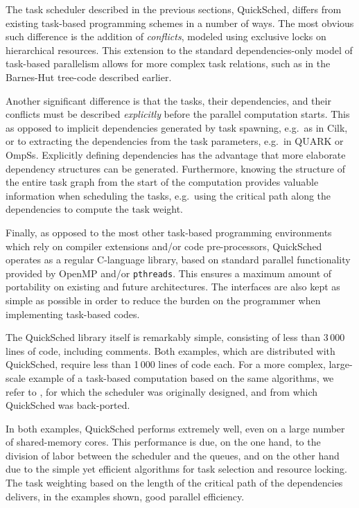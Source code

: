\documentclass[preprint]{elsarticle}
\begin{document}
The task scheduler described in the previous sections, QuickSched,
differs from existing task-based programming schemes
in a number of ways.
The most obvious such difference is the addition of {\em conflicts},
modeled using exclusive locks on hierarchical resources.
This extension to the standard dependencies-only model
of task-based parallelism allows for more complex task relations,
such as in the Barnes-Hut tree-code described earlier.

Another significant difference is that the tasks, their
dependencies, and their conflicts must be described
{\em explicitly} before the parallel computation starts.
This as opposed to implicit dependencies generated
by task spawning, e.g.~as in Cilk, or to extracting the
dependencies from the task parameters, e.g.~in QUARK or OmpSs.
Explicitly defining dependencies has the advantage that 
more elaborate dependency structures can be generated.
Furthermore, knowing the structure of the entire task
graph from the start of the computation provides valuable
information when scheduling the tasks, e.g.~using the 
critical path along the dependencies to compute the
task weight.

Finally, as opposed to the most other task-based
programming environments which rely on compiler extensions
and/or code pre-processors, QuickSched operates as a regular
C-language library, based on standard parallel functionality
provided by OpenMP and/or {\tt pthreads}.
This ensures a maximum amount of portability on existing
and future architectures.
The interfaces are also kept as simple
as possible in order to reduce the burden on the programmer
when implementing task-based codes.

The QuickSched library itself is remarkably simple, consisting of
less than 3\,000 lines of code, including comments.
Both examples, which are distributed with QuickSched,
require less than 1\,000 lines of code each.
For a more complex, large-scale example of a task-based computation
based on the same algorithms, we refer to \cite{ref:Gonnet2014},
for which the scheduler was originally designed, and from
which QuickSched was back-ported.

In both examples, QuickSched performs extremely well, even
on a large number of shared-memory cores.
This performance is due, on the one hand, to the
division of labor between the scheduler and the queues,
and on the other hand due to the simple yet efficient
algorithms for task selection and resource locking.
The task weighting based on the length of the critical
path of the dependencies delivers, in the examples shown,
good parallel efficiency.
\end{document}
